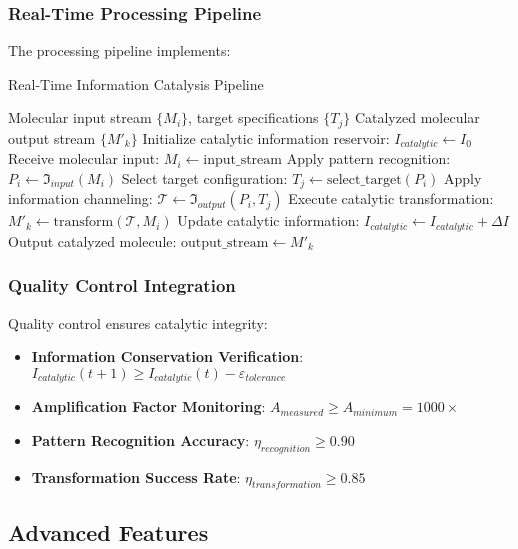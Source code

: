 \subsubsection{Real-Time Processing Pipeline}

The processing pipeline implements:

\begin{algorithm}[H]
\caption{Real-Time Information Catalysis Pipeline}
\begin{algorithmic}[1]
\REQUIRE Molecular input stream $\{M_i\}$, target specifications $\{T_j\}$
\ENSURE Catalyzed molecular output stream $\{M'_k\}$
\STATE Initialize catalytic information reservoir: $I_{catalytic} \leftarrow I_0$
    \STATE Receive molecular input: $M_i \leftarrow \text{input\_stream}$
    \STATE Apply pattern recognition: $P_i \leftarrow \mathfrak{I}_{input}(M_i)$
    \STATE Select target configuration: $T_j \leftarrow \text{select\_target}(P_i)$
    \STATE Apply information channeling: $\mathcal{T} \leftarrow \mathfrak{I}_{output}(P_i, T_j)$
    \STATE Execute catalytic transformation: $M'_k \leftarrow \text{transform}(\mathcal{T}, M_i)$
    \STATE Update catalytic information: $I_{catalytic} \leftarrow I_{catalytic} + \Delta I$
    \STATE Output catalyzed molecule: $\text{output\_stream} \leftarrow M'_k$
\ENDWHILE
\end{algorithmic}
\end{algorithm}

\subsubsection{Quality Control Integration}

Quality control ensures catalytic integrity:

\begin{itemize}
\item \textbf{Information Conservation Verification}: $I_{catalytic}(t+1) \geq I_{catalytic}(t) - \varepsilon_{tolerance}$
\item \textbf{Amplification Factor Monitoring}: $A_{measured} \geq A_{minimum} = 1000\times$
\item \textbf{Pattern Recognition Accuracy}: $\eta_{recognition} \geq 0.90$
\item \textbf{Transformation Success Rate}: $\eta_{transformation} \geq 0.85$
\end{itemize}

\subsection{Advanced Features}

